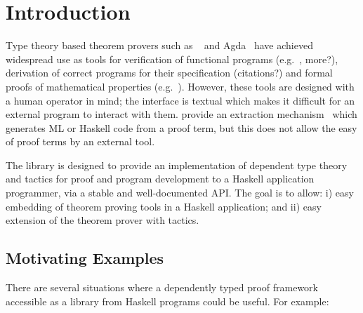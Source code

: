 \section{Introduction}


Type theory based theorem provers such as
\Coq{}~\cite{coq-manual} and Agda~\cite{agda} have achieved widespread
use as tools for verification of functional programs
(e.g.~\cite{leroy-compiler}, more?), derivation of correct programs
for their specification (citations?) and formal proofs
of mathematical properties (e.g.~\cite{four-colour}).  
However, these tools are designed with a
human operator in mind; the interface is textual which makes it
difficult for an external program to interact with them. \Coq{}
provide an extraction mechanism~\cite{extraction-coq} which generates
ML or Haskell code from a proof term, but this does not allow the easy
 of proof terms by an external tool.


The \Ivor{} library is designed to provide an implementation of
dependent type theory and tactics for proof and program development to
a Haskell application programmer, via a stable and well-documented
API. The goal is to allow: i) easy embedding of theorem proving tools
in a Haskell application; and ii) easy extension of the theorem prover
with  tactics.


\subsection{Motivating Examples}

There are several situations where a dependently typed proof framework
accessible as a library from Haskell programs could be useful. For
example:


